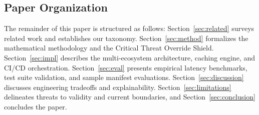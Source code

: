 \subsection{Paper Organization}
The remainder of this paper is structured as follows: Section~\ref{sec:related} surveys related work and establishes our taxonomy. Section~\ref{sec:method} formalizes the mathematical methodology and the Critical Threat Override Shield. Section~\ref{sec:impl} describes the multi-ecosystem architecture, caching engine, and CI/CD orchestration. Section~\ref{sec:eval} presents empirical latency benchmarks, test suite validation, and sample manifest evaluations. Section~\ref{sec:discussion} discusses engineering tradeoffs and explainability. Section~\ref{sec:limitations} delineates threats to validity and current boundaries, and Section~\ref{sec:conclusion} concludes the paper.
